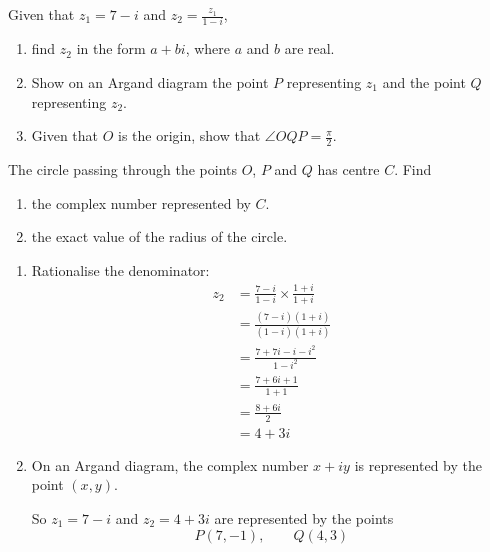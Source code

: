 \documentclass[leqno]{article}
\begin{document}
\begin{enumerate}[
  label=\textbf{\arabic*.},
  leftmargin=*,
  topsep=0pt,
  partopsep=0pt,
  parsep=0pt
]
Given that $z_1=7-i$ and $z_2=\frac{z_1}{1-i}$, \\
\begin{enumerate}[label=\textbf{(\alph*)}]
  \item find $z_2$ in the form $a+bi$, where $a$ and $b$ are real.  \\
  \item Show on an Argand diagram the point $P$ representing $z_1$ and the point $Q$ representing $z_2$.  \\
  \item Given that $O$ is the origin, show that $\angle OQP=\frac{\pi}{2}$.  \\
\end{enumerate}
The circle passing through the points $O$, $P$ and $Q$ has centre $C$. Find \\
\begin{enumerate}[label=\textbf{(\alph*)}, resume]
  \item the complex number represented by $C$.  \\
  \item the exact value of the radius of the circle.  \\
\end{enumerate}

\vspace*{10pt}

\begin{djsSolution}
\begin{enumerate}[label=\textbf{(\alph*)}]
  \item Rationalise the denominator:
  \begin{align*}
  z_2&=\frac{7-i}{1-i}\times\frac{1+i}{1+i}\\
     &=\frac{(7-i)(1+i)}{(1-i)(1+i)}\\
     &=\frac{7+7i-i-i^2}{1-i^2}\\
     &=\frac{7+6i+1}{1+1}\\
     &=\frac{8+6i}{2}\\
     &=4+3i
  \end{align*}

  \item On an Argand diagram, the complex number $x+iy$ is represented by the point $(x,y)$.

  So \(z_1=7-i\) and \(z_2=4+3i\) are represented by the points
  \[
  P(7,-1),\qquad Q(4,3)
  \]


\end{enumerate}
\end{djsSolution}
\end{enumerate}
\end{document}
